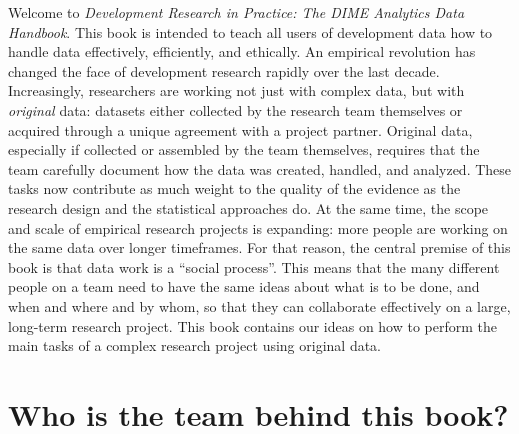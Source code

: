 \begin{fullwidth}
Welcome to \textit{Development Research in Practice: The DIME Analytics Data Handbook}.
This book is intended to teach all users of development data
how to handle data effectively, efficiently, and ethically.
An empirical revolution has changed the face of development research rapidly over the last decade.
Increasingly, researchers are working not just with complex data,
but with \textit{original} data:
datasets either collected by the research team themselves
or acquired through a unique agreement with a project partner.
Original data, especially if collected or assembled by the team themselves,
requires that the team carefully document how the data was created, handled, and analyzed.
These tasks now contribute as much weight to the quality of the evidence
as the research design and the statistical approaches do.
At the same time, the scope and scale of empirical research projects is expanding:
more people are working on the same data over longer timeframes.
For that reason, the central premise of this book is that data work is a ``social process''.
This means that the many different people on a team need to have the same ideas
about what is to be done, and when and where and by whom,
so that they can collaborate effectively on a large, long-term research project.
This book contains our ideas on how to perform the main tasks
of a complex research project using original data.

\end{fullwidth}


\section{Who is the team behind this book?}

